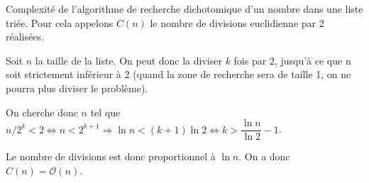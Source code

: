\documentclass[10pt,fleqn]{article} %
\begin{document}
\begin{exemple}
Complexité de l'algorithme de recherche dichotomique d'un nombre dans une liste triée. Pour cela appelons $C(n)$ le nombre de divisions euclidienne par 2 réalisées. 

 Soit $n$ la taille de la liste. On peut donc la diviser $k$ fois par 2, jusqu'à ce que n soit strictement inférieur à 2 (quand la zone de recherche sera de taille 1, on ne pourra plus diviser le problème).
 
 On cherche donc $n$ tel que $n/2^k<2 \Leftrightarrow n< 2^{k+1} \Rightarrow \ln n < \left( k+1\right) \ln 2 \Leftrightarrow k > \dfrac{\ln n}{\ln 2}  - 1$.
 
 Le nombre de divisions est donc proportionnel à $\ln n$. On a donc $C(n)=\mathcal{O}(n)$.

\end{exemple}
\end{document}
